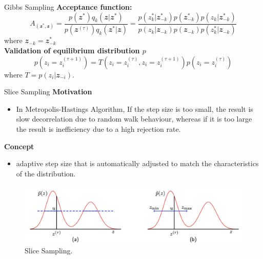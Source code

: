 \documentclass{bredelebeamer}
\begin{document}
\begin{frame}{Gibbs Sampling}
  \textbf{Acceptance function:}
  \begin{equation}
    A_(\mathbfit{z}^{*}, \mathbfit{z})
    =
      \frac{p(\mathbfit{z}^{*}) q_k(\mathbfit{z}|\mathbfit{z}^{*})}
      {p(\mathbfit{z}^{(\tau)}) q_k(\mathbfit{z}^{*}|\mathbfit{z})}
    =
    \frac{p(z_k^{*}|\mathbfit{z}_{-k}^{*}) p(\mathbfit{z}_{-k}^{*}) p(z_k|\mathbfit{z}_{-k}^{*})}
    {p(z_k|\mathbfit{z}_{-k}) p(\mathbfit{z}_{-k}) p(z_k^{*}|\mathbfit{z}_{-k})}
  \end{equation}
  where $\mathbfit{z}_{-k} = \mathbfit{z}^{*}_{-k}$
  \\[1.0\baselineskip]

  \textbf{Validation of equilibrium distribution $p$}
  \begin{equation}
    p(z_i = z_i^{(\tau + 1)}) = T(z_i = z_i^{(\tau)}, z_i = z_i^{(\tau + 1)}) p(z_i = z_i^{(\tau)})
  \end{equation}
  where $T = p(z_i|\mathbfit{z}_{-i})$.
\end{frame}

\begin{frame}{Slice Sampling}
  \textbf{Motivation}
  \begin{itemize}
    \item In Metropolis-Hastings Algorithm, If the step size is too small, the
    result is slow decorrelation due to random walk behaviour, whereas if it is
    too large the result is inefficiency due to a high rejection rate.
  \end{itemize}

  \textbf{Concept}
  \begin{itemize}
    \item adaptive step size that is automatically adjusted to match the
    characteristics of the distribution.
  \end{itemize}

  \begin{figure}
  \centering
  \includegraphics[scale=0.4]{slice_sampling.png}
  \caption{
    Slice Sampling.
  }
  \end{figure}
\end{frame}

\end{document}
